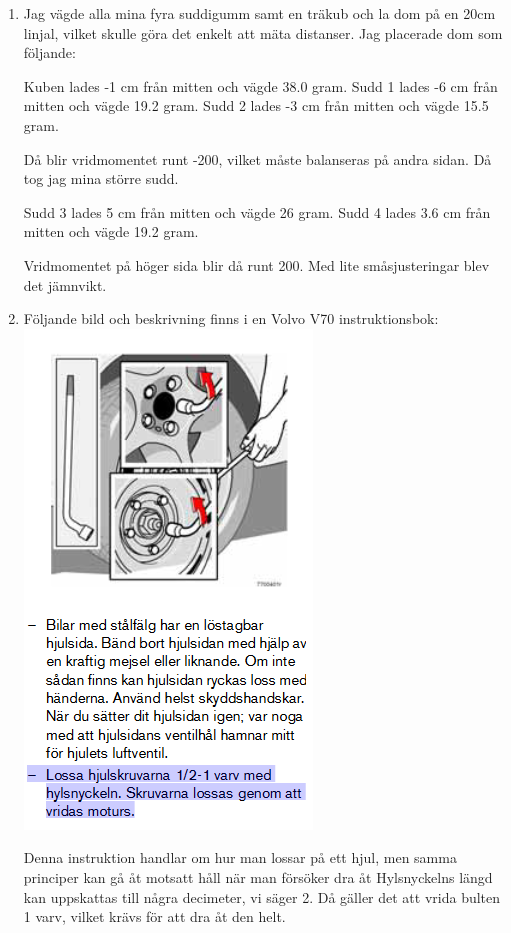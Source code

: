 \documentclass[a4paper,12pt]{article}
\begin{document}
\begin{enumerate}
      \item Jag vägde alla mina fyra suddigumm samt en träkub
            och la dom på en 20cm linjal, vilket skulle göra det enkelt
            att mäta distanser. Jag placerade dom som följande:

            Kuben lades -1 cm från mitten och vägde 38.0 gram.
            Sudd 1 lades -6 cm från mitten och vägde 19.2 gram.
            Sudd 2 lades -3 cm från mitten och vägde 15.5 gram.

            Då blir vridmomentet runt -200, vilket måste balanseras på andra sidan.
            Då tog jag mina större sudd.

            Sudd 3 lades 5 cm från mitten och vägde 26 gram.
            Sudd 4 lades 3.6 cm från mitten och vägde 19.2 gram.

            Vridmomentet på höger sida blir då runt 200.
            Med lite småsjusteringar blev det jämnvikt.

      \item
            Följande bild och beskrivning finns i en Volvo V70 instruktionsbok:
            \includegraphics{Figur.png}

            Denna instruktion handlar om hur man lossar på ett hjul, men samma principer
            kan gå åt motsatt håll när man försöker dra åt
            Hylsnyckelns längd kan uppskattas till några decimeter, vi säger 2. Då gäller det att vrida
            bulten 1 varv, vilket krävs för att dra åt den helt.


\end{enumerate}
\end{document}
